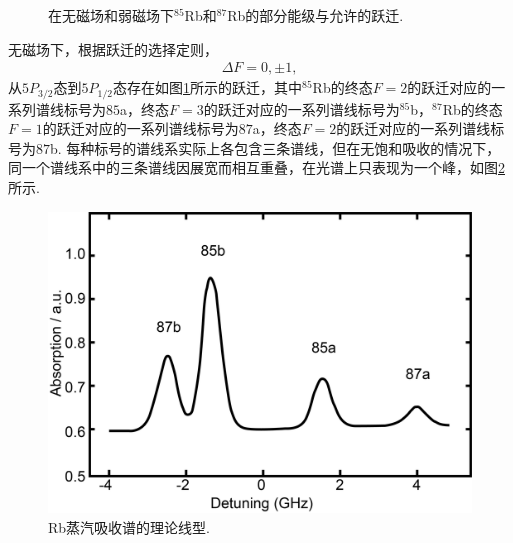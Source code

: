 \documentclass[UTF8,a4paper,10pt]{article}
\begin{document}
\begin{figure}[ht]
    \centering
    \caption{在无磁场和弱磁场下$^{85}$Rb和$^{87}$Rb的部分能级与允许的跃迁.}
    \label{energy-state}
\end{figure}

无磁场下，根据跃迁的选择定则，
\begin{align}
    \Delta F=0,\pm 1,
\end{align}
从$5P_{3/2}$态到$5P_{1/2}$态存在如图\ref{energy-state}所示的跃迁，其中$^{85}$Rb的终态$F=2$的跃迁对应的一系列谱线标号为$85$a，终态$F=3$的跃迁对应的一系列谱线标号为$^{85}$b，$^{87}$Rb的终态$F=1$的跃迁对应的一系列谱线标号为$87$a，终态$F=2$的跃迁对应的一系列谱线标号为$87$b. 每种标号的谱线系实际上各包含三条谱线，但在无饱和吸收的情况下，同一个谱线系中的三条谱线因展宽而相互重叠，在光谱上只表现为一个峰，如图\ref{theoretical-absorption}所示.

\begin{figure}[h]
    \centering
    \includegraphics[width=.4\textwidth]{TheoreticalAbsorption.png}
    \caption{Rb蒸汽吸收谱的理论线型.}
    \label{theoretical-absorption}
\end{figure}
\end{document}
